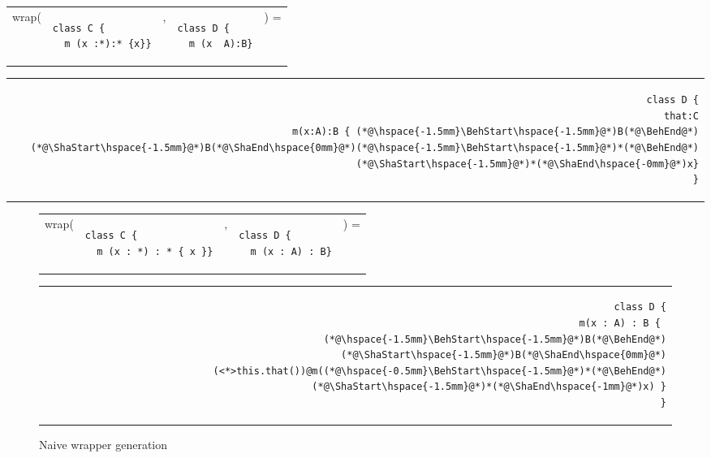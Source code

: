 \documentclass[acmlarge, anonymous, authordraft]{acmart}
\begin{document}
{  \small
\hspace{-6mm}\begin{tabular}{ER{3.5cm}ER{3cm}l}
wrap( & 
\begin{lstlisting}
class C {
  m (x :*):* {x}}
\end{lstlisting}& , &
\begin{lstlisting}
class D {
  m (x  A):B}
\end{lstlisting}&) =
\end{tabular}
\begin{tabular}{@{}l@{}r@{}}
&
\begin{minipage}{6cm}
\begin{lstlisting}
class D {
 that:C
 m(x:A):B { (*@\hspace{-1.5mm}\BehStart\hspace{-1.5mm}@*)B(*@\BehEnd@*)(*@\ShaStart\hspace{-1.5mm}@*)B(*@\ShaEnd\hspace{0mm}@*)(*@\hspace{-1.5mm}\BehStart\hspace{-1.5mm}@*)*(*@\BehEnd@*)(*@\ShaStart\hspace{-1.5mm}@*)*(*@\ShaEnd\hspace{-0mm}@*)x}
}
\end{lstlisting}
\end{minipage}
\end{tabular}
}


\begin{figure}[!ht]
\begin{tabular}{ER{4.5cm}ER{3.5cm}E}
wrap( & 
\begin{lstlisting}
class C { 
  m (x : *) : * { x }}
\end{lstlisting}& , &
\begin{lstlisting}
class D { 
  m (x : A) : B}
\end{lstlisting}&) =
\end{tabular}
\begin{tabular}{@{}l@{}r@{}}
\hspace{4cm} \,&
\begin{minipage}{\textwidth-4cm}
\begin{lstlisting}
class D {
  m(x : A) : B { 
    (*@\hspace{-1.5mm}\BehStart\hspace{-1.5mm}@*)B(*@\BehEnd@*)(*@\ShaStart\hspace{-1.5mm}@*)B(*@\ShaEnd\hspace{0mm}@*)(<*>this.that())@m((*@\hspace{-0.5mm}\BehStart\hspace{-1.5mm}@*)*(*@\BehEnd@*)(*@\ShaStart\hspace{-1.5mm}@*)*(*@\ShaEnd\hspace{-1mm}@*)x) }
}
\end{lstlisting}
\end{minipage}
\end{tabular}
\caption{Naive wrapper generation}
\label{fig:rktex2}
\end{figure}
\end{document}
